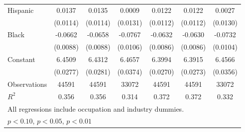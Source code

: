 {\begin{longtable}{l*{6}{c}}
Hispanic            &      0.0137         &      0.0135         &      0.0009         &      0.0122         &      0.0122         &      0.0027         \\
                    &    (0.0114)         &    (0.0114)         &    (0.0131)         &    (0.0112)         &    (0.0112)         &    (0.0130)         \\
Black               &     -0.0662\sym{***}&     -0.0658\sym{***}&     -0.0767\sym{***}&     -0.0632\sym{***}&     -0.0630\sym{***}&     -0.0732\sym{***}\\
                    &    (0.0088)         &    (0.0088)         &    (0.0106)         &    (0.0086)         &    (0.0086)         &    (0.0104)         \\
Constant            &      6.4509\sym{***}&      6.4312\sym{***}&      6.4657\sym{***}&      6.3994\sym{***}&      6.3915\sym{***}&      6.4566\sym{***}\\
                    &    (0.0277)         &    (0.0281)         &    (0.0374)         &    (0.0270)         &    (0.0273)         &    (0.0356)         \\
\hline  
Observations        &       44591         &       44591         &       33072         &       44591         &       44591         &       33072         \\
\(R^{2}\)           &       0.356         &       0.356         &       0.314         &       0.372         &       0.372         &       0.332         \\
\hline  
\multicolumn{7}{l}{\footnotesize All regressions include occupation and industry dummies.}\\
\multicolumn{7}{l}{\footnotesize \sym{*} \(p<0.10\), \sym{**} \(p<0.05\), \sym{***} \(p<0.01\)}\\
\end{longtable}
}
